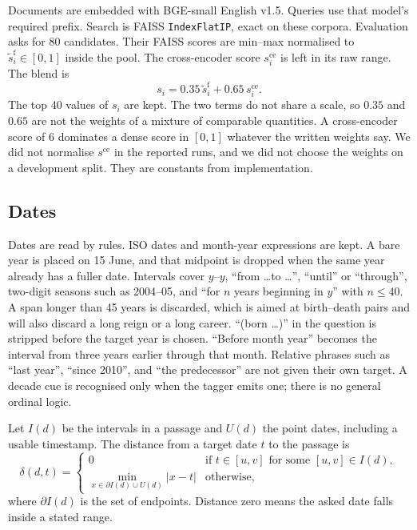 \documentclass[11pt,letterpaper]{article}
\begin{document}
Documents are embedded with BGE-small English v1.5.
Queries use that model's required prefix.
Search is FAISS \texttt{IndexFlatIP}, exact on these corpora.
Evaluation asks for 80 candidates.
Their FAISS scores are min--max normalised to $\tilde{s}^{\mathrm{f}}_i\in[0,1]$ inside the pool.
The cross-encoder score $s^{\mathrm{ce}}_i$ is left in its raw range.
The blend is
\begin{equation}
s_i = 0.35\,\tilde{s}^{\mathrm{f}}_i + 0.65\,s^{\mathrm{ce}}_i .
\label{eq:blend}
\end{equation}
The top 40 values of $s_i$ are kept.
The two terms do not share a scale, so $0.35$ and $0.65$ are not the weights of a mixture of comparable quantities.
A cross-encoder score of $6$ dominates a dense score in $[0,1]$ whatever the written weights say.
We did not normalise $s^{\mathrm{ce}}$ in the reported runs, and we did not choose the weights on a development split.
They are constants from implementation.

\subsection{Dates}
\label{sec:dates}

Dates are read by rules.
ISO dates and month-year expressions are kept.
A bare year is placed on 15 June, and that midpoint is dropped when the same year already has a fuller date.
Intervals cover $y$--$y$, ``from \ldots to \ldots'', ``until'' or ``through'', two-digit seasons such as 2004--05, and ``for $n$ years beginning in $y$'' with $n\le 40$.
A span longer than 45 years is discarded, which is aimed at birth--death pairs and will also discard a long reign or a long career.
``(born \ldots)'' in the question is stripped before the target year is chosen.
``Before month year'' becomes the interval from three years earlier through that month.
Relative phrases such as ``last year'', ``since 2010'', and ``the predecessor'' are not given their own target.
A decade cue is recognised only when the tagger emits one; there is no general ordinal logic.

Let $I(d)$ be the intervals in a passage and $U(d)$ the point dates, including a usable timestamp.
The distance from a target date $t$ to the passage is
\begin{equation}
\delta(d, t) =
\begin{cases}
0 & \text{if } t \in [u,v] \text{ for some } [u,v]\in I(d),\\[0.25em]
\min\limits_{x \in \partial I(d)\cup U(d)} |x-t| & \text{otherwise,}
\end{cases}
\label{eq:delta}
\end{equation}
where $\partial I(d)$ is the set of endpoints.
Distance zero means the asked date falls inside a stated range.
\end{document}
